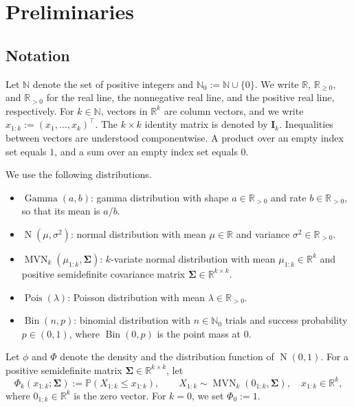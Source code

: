 \documentclass[11pt,authoryear]{elsarticle}
\def\Real{\mathbb{R}}
\def\P#1{{\mathbb{P}}\left(#1\right)}
\numberwithin{equation}{section}
\begin{document}
\section{Preliminaries}
\label{sec.prelim}

\subsection{Notation}

Let \(\mathbb N\) denote the set of positive integers and
\(\mathbb N_0:=\mathbb N\cup\{0\}\). We write \(\Real\),
\(\Real_{\ge0}\), and \(\Real_{>0}\) for the real line, the nonnegative
real line, and the positive real line, respectively. For
\(k\in\mathbb N\), vectors in \(\Real^k\) are column vectors, and we
write \(x_{1:k}:=(x_1,\ldots,x_k)^\top\). The \(k\times k\) identity
matrix is denoted by \(\boldsymbol I_k\). Inequalities between vectors
are understood componentwise. A product over an empty index set equals
\(1\), and a sum over an empty index set equals \(0\).

We use the following distributions.
\begin{itemize}
  \setlength\itemsep{0em}
  \item \(\operatorname{Gamma}(a,b)\): gamma distribution with shape
  \(a\in\Real_{>0}\) and rate \(b\in\Real_{>0}\), so that its mean is
  \(a/b\).
  \item \(\operatorname{N}(\mu,\sigma^2)\): normal distribution with mean
  \(\mu\in\Real\) and variance \(\sigma^2\in\Real_{>0}\).
  \item \(\operatorname{MVN}_k(\mu_{1:k},\boldsymbol\Sigma)\):
  \(k\)-variate normal distribution with mean \(\mu_{1:k}\in\Real^k\) and
  positive semidefinite covariance matrix
  \(\boldsymbol\Sigma\in\Real^{k\times k}\).
  \item \(\operatorname{Pois}(\lambda)\): Poisson distribution with mean
  \(\lambda\in\Real_{>0}\).
  \item \(\operatorname{Bin}(n,p)\): binomial distribution with
  \(n\in\mathbb N_0\) trials and success probability \(p\in(0,1)\), where
  \(\operatorname{Bin}(0,p)\) is the point mass at \(0\).
\end{itemize}

Let \(\phi\) and \(\Phi\) denote the density and the distribution
function of \(\operatorname{N}(0,1)\). For a positive semidefinite
matrix \(\boldsymbol\Sigma\in\Real^{k\times k}\), let
\[
\Phi_k(x_{1:k};\boldsymbol\Sigma)
:=
\P{X_{1:k}\le x_{1:k}},
\qquad
X_{1:k}\sim\operatorname{MVN}_k(0_{1:k},\boldsymbol\Sigma),
\quad
x_{1:k}\in\Real^k,
\]
where \(0_{1:k}\in\Real^k\) is the zero vector. For \(k=0\), we set
\(\Phi_0:=1\).
\end{document}
